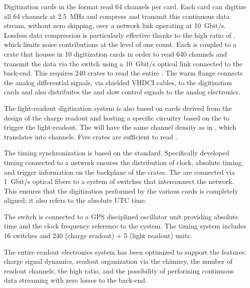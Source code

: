 Digitization cards in the  format read \num{64} channels per card. Each  card can digitize all  \num{64} channels at \SI{2.5}{MHz} and compress and transmit this continuous data stream, without zero skipping, over a network link operating at \SI{10}{Gbit/s}. Lossless data compression is particularly effective thanks to the high  ratio  of , which limits noise contributions at the level of one  count. Each  is coupled to a  crate that houses in \num{10}  digitization cards in order to read  \num{640} channels and transmit the data via the  switch using a \SI{10}{Gbit/s} optical link connected to the  back-end. This requires \num{240}  crates to read the entire . The  warm flange connects the analog differential signals, via shielded VHDCI cables, to the  digitization cards and also distributes the  and slow control signals to the analog  electronics.  

The light-readout digitization system is also based on   cards derived from the design of the charge readout and hosting a specific circuitry based on the   to trigger the light-readout. The   will have the same  channel density as in , which translates into \dpnumpmtch channels. Five  crates are sufficient to read \dpnumpmtch {}.

The timing synchronization is based on the  standard. Specifically developed timing  connected to a  network ensures the distribution of clock, absolute timing, and trigger information on the backplane of the  crates. The  are connected via \SI{1}{Gbit/s} optical fibers to a system of  switches that interconnect the  network. This ensures that the digitization performed by the various  cards is completely aligned; it also refers to the absolute UTC time. 

The  switch is connected to a GPS disciplined oscillator unit providing absolute time and the clock frequency reference to the system. The timing system includes \num{16}  switches and \num{240} (charge readout) + \num{5} (light readout)  units.    

The entire readout electronics system has been optimized to support the  features: charge signal dynamics, readout organization via the chimney, the number of readout channels, the high  ratio, and the possibility of performing continuous data streaming with zero losses to the  back-end. 

